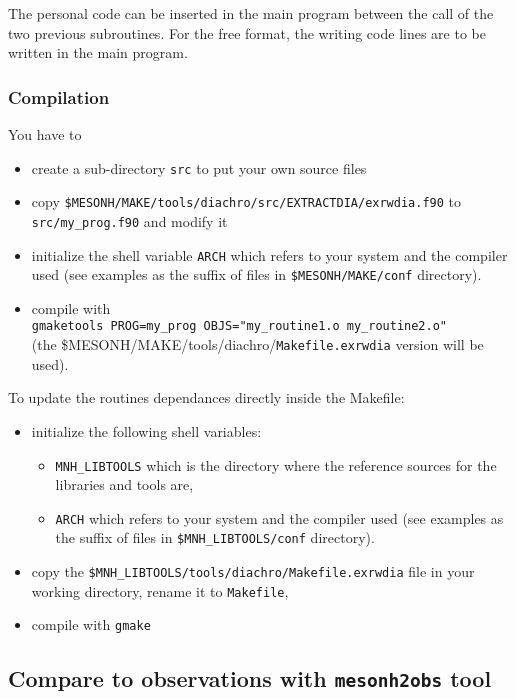 The personal code can be inserted in the main program between the call of the
two previous subroutines. For the {\sc free} format, the writing code lines
are to be written in the main program.

\subsubsection{Compilation}
You have to 
\begin{itemize}
\item create a sub-directory {\tt src} to put your own source files
\item copy {\tt\$MESONH/MAKE/tools/diachro/src/EXTRACTDIA/exrwdia.f90} to {\tt src/my\_prog.f90} and modify it
\item initialize the shell variable {\tt ARCH} which refers to your system and the compiler used (see 
examples as the suffix of files in {\tt \$MESONH/MAKE/conf} directory).
\item compile with \\
{\tt gmaketools PROG=my\_prog OBJS="my\_routine1.o my\_routine2.o" } \\ 
(the \$MESONH/MAKE/tools/diachro/{\tt Makefile.exrwdia} version will be used).
\end{itemize}

\noindent To update the routines dependances directly inside the  Makefile:
\begin{itemize}
\item initialize the following shell variables:
\begin{itemize}
\item {\tt MNH\_LIBTOOLS} which is the directory where the reference sources
for the libraries and tools are,
\item {\tt ARCH} which refers to your system and the compiler used (see 
examples as the suffix of files in {\tt \$MNH\_LIBTOOLS/conf} directory). 
\end{itemize}
\item copy the {\tt \$MNH\_LIBTOOLS/tools/diachro/Makefile.exrwdia} file in your working directory, 
rename it to \texttt{Makefile},
\item compile with {\tt gmake}
\end{itemize}


\subsection{Compare to observations with 
{\tt mesonh2obs} tool \label{mnh2obs}}
